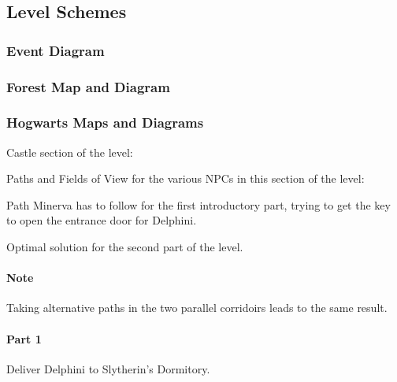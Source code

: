\pagebreak

\subsection{Level Schemes}

\subsubsection{Event Diagram}

\subsubsection{Forest Map and Diagram}

\subsubsection{Hogwarts Maps and Diagrams}

Castle section of the level:

Paths and Fields of View for the various NPCs in this section of the level:

Path Minerva has to follow for the first introductory part, trying to get the key to open the entrance door for Delphini.

Optimal solution for the second part of the level. 

\paragraph{Note} Taking alternative paths in the two parallel corridoirs leads to the same result.

\paragraph{Part 1} Deliver Delphini to Slytherin's Dormitory.

